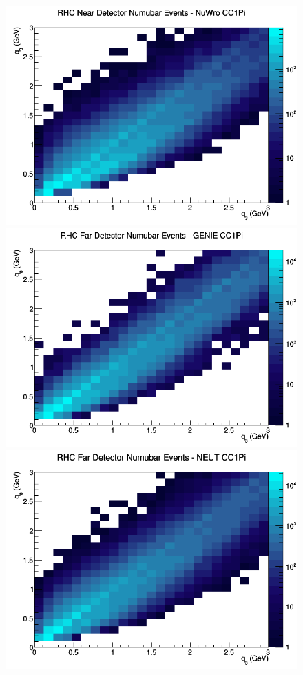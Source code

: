 \documentclass[12pt]{article}
\begin{document}
\begin{figure}[h]
\includegraphics[width=\linewidth]{eff_q0_q3/FGT/CC1Pi_RHC_ND_numubar_q3_q0_NuWro.png}
\endminipage
\newline
{}
\includegraphics[width=\linewidth]{eff_q0_q3/FGT/CC1Pi_RHC_FD_numubar_q3_q0_GENIE.png}
\endminipage
{}
\includegraphics[width=\linewidth]{eff_q0_q3/FGT/CC1Pi_RHC_FD_numubar_q3_q0_NEUT.png}

\end{figure}
\end{document}
